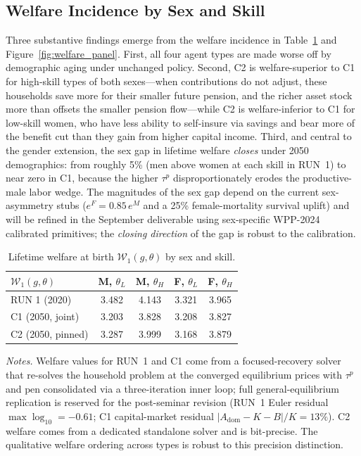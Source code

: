 \documentclass[12pt,a4paper]{article}
\begin{document}
\subsection{Welfare Incidence by Sex and Skill}
\label{subsec:aging_welfare}

Three substantive findings emerge from the welfare incidence in Table~\ref{tab:welfare_aging} and Figure~\ref{fig:welfare_panel}. First, all four agent types are made worse off by demographic aging under unchanged policy. Second, C2 is welfare-superior to C1 for high-skill types of both sexes---when contributions do not adjust, these households save more for their smaller future pension, and the richer asset stock more than offsets the smaller pension flow---while C2 is welfare-inferior to C1 for low-skill women, who have less ability to self-insure via savings and bear more of the benefit cut than they gain from higher capital income. Third, and central to the gender extension, the sex gap in lifetime welfare \emph{closes} under 2050 demographics: from roughly 5\% (men above women at each skill in RUN~1) to near zero in C1, because the higher $\tau^p$ disproportionately erodes the productive-male labor wedge. The magnitudes of the sex gap depend on the current sex-asymmetry stubs ($e^F = 0.85\,e^M$ and a 25\% female-mortality survival uplift) and will be refined in the September deliverable using sex-specific WPP-2024 calibrated primitives; the \emph{closing direction} of the gap is robust to the calibration.

\begin{table}[H]
\centering
\caption{Lifetime welfare at birth $\mathcal{W}_1(g,\theta)$ by sex and skill.}
\label{tab:welfare_aging}
\begin{tabular}{lcccc}
\toprule
$\mathcal{W}_1(g, \theta)$ & M, $\theta_L$ & M, $\theta_H$ & F, $\theta_L$ & F, $\theta_H$ \\
\midrule
RUN 1 (2020)        & 3.482 & 4.143 & 3.321 & 3.965 \\
C1 (2050, joint)    & 3.203 & 3.828 & 3.208 & 3.827 \\
C2 (2050, pinned)   & 3.287 & 3.999 & 3.168 & 3.879 \\
\bottomrule
\end{tabular}

\vspace{0.5em}
\begin{minipage}{0.92\textwidth}
\footnotesize \textit{Notes.} Welfare values for RUN~1 and C1 come from a focused-recovery solver that re-solves the household problem at the converged equilibrium prices with $\tau^p$ and $\text{pen}$ consolidated via a three-iteration inner loop; full general-equilibrium replication is reserved for the post-seminar revision (RUN~1 Euler residual $\max\log_{10}=-0.61$; C1 capital-market residual $|A_{\mathrm{dom}}-K-B|/K = 13\%$). C2 welfare comes from a dedicated standalone solver and is bit-precise. The qualitative welfare ordering across types is robust to this precision distinction.
\end{minipage}
\end{table}
\end{document}
